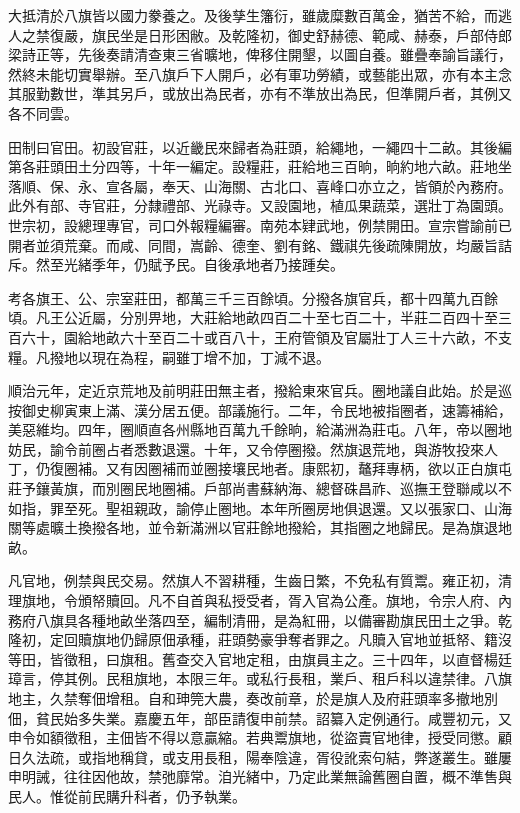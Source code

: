 \begin{pinyinscope}
大抵清於八旗皆以國力豢養之。及後孳生籓衍，雖歲糜數百萬金，猶苦不給，而逃人之禁復嚴，旗民坐是日形困敝。及乾隆初，御史舒赫德、範咸、赫泰，戶部侍郎梁詩正等，先後奏請清查東三省曠地，俾移住開墾，以圖自養。雖疊奉諭旨議行，然終未能切實舉辦。至八旗戶下人開戶，必有軍功勞績，或藝能出眾，亦有本主念其服勤數世，準其另戶，或放出為民者，亦有不準放出為民，但準開戶者，其例又各不同雲。

田制曰官田。初設官莊，以近畿民來歸者為莊頭，給繩地，一繩四十二畝。其後編第各莊頭田土分四等，十年一編定。設糧莊，莊給地三百晌，晌約地六畝。莊地坐落順、保、永、宣各屬，奉天、山海關、古北口、喜峰口亦立之，皆領於內務府。此外有部、寺官莊，分隸禮部、光祿寺。又設園地，植瓜果蔬菜，選壯丁為園頭。世宗初，設總理專官，司口外報糧編審。南苑本肄武地，例禁開田。宣宗嘗諭前已開者並須荒棄。而咸、同間，嵩齡、德奎、劉有銘、鐵祺先後疏陳開放，均嚴旨詰斥。然至光緒季年，仍賦予民。自後承地者乃接踵矣。

考各旗王、公、宗室莊田，都萬三千三百餘頃。分撥各旗官兵，都十四萬九百餘頃。凡王公近屬，分別畀地，大莊給地畝四百二十至七百二十，半莊二百四十至三百六十，園給地畝六十至百二十或百八十，王府管領及官屬壯丁人三十六畝，不支糧。凡撥地以現在為程，嗣雖丁增不加，丁減不退。

順治元年，定近京荒地及前明莊田無主者，撥給東來官兵。圈地議自此始。於是巡按御史柳寅東上滿、漢分居五便。部議施行。二年，令民地被指圈者，速籌補給，美惡維均。四年，圈順直各州縣地百萬九千餘晌，給滿洲為莊屯。八年，帝以圈地妨民，諭令前圈占者悉數退還。十年，又令停圈撥。然旗退荒地，與游牧投來人丁，仍復圈補。又有因圈補而並圈接壤民地者。康熙初，鼇拜專柄，欲以正白旗屯莊予鑲黃旗，而別圈民地圈補。戶部尚書蘇納海、總督硃昌祚、巡撫王登聯咸以不如指，罪至死。聖祖親政，諭停止圈地。本年所圈房地俱退還。又以張家口、山海關等處曠土換撥各地，並令新滿洲以官莊餘地撥給，其指圈之地歸民。是為旗退地畝。

凡官地，例禁與民交易。然旗人不習耕種，生齒日繁，不免私有質鬻。雍正初，清理旗地，令頒帑贖回。凡不自首與私授受者，胥入官為公產。旗地，令宗人府、內務府八旗具各種地畝坐落四至，編制清冊，是為紅冊，以備審勘旗民田土之爭。乾隆初，定回贖旗地仍歸原佃承種，莊頭勢豪爭奪者罪之。凡贖入官地並抵帑、籍沒等田，皆徵租，曰旗租。舊查交入官地定租，由旗員主之。三十四年，以直督楊廷璋言，停其例。民租旗地，本限三年。或私行長租，業戶、租戶科以違禁律。八旗地主，久禁奪佃增租。自和珅筦大農，奏改前章，於是旗人及府莊頭率多撤地別佃，貧民始多失業。嘉慶五年，部臣請復申前禁。詔纂入定例通行。咸豐初元，又申令如額徵租，主佃皆不得以意贏縮。若典鬻旗地，從盜賣官地律，授受同懲。顧日久法疏，或指地稱貸，或支用長租，陽奉陰違，胥役訛索句結，弊遂叢生。雖屢申明誡，往往因他故，禁弛靡常。洎光緒中，乃定此業無論舊圈自置，概不準售與民人。惟從前民購升科者，仍予執業。


\end{pinyinscope}
